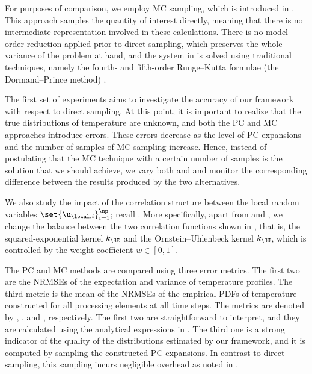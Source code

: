 For purposes of comparison, we employ \ac{MC} sampling, which is introduced in
. This approach samples the quantity of interest directly, meaning
that there is no intermediate representation involved in these calculations.
There is no model order reduction applied prior to direct sampling, which
preserves the whole variance of the problem at hand, and the system in
 is solved using traditional techniques, namely
the fourth- and fifth-order Runge--Kutta formulae (the Dormand--Prince method)
\cite{press2007}.


The first set of experiments aims to investigate the accuracy of our framework
with respect to direct sampling. At this point, it is important to realize that
the true distributions of temperature are unknown, and both the \ac{PC} and
\ac{MC} approaches introduce errors. These errors decrease as the level \lc of
\ac{PC} expansions and the number of samples \no of \ac{MC} sampling increase.
Hence, instead of postulating that the \ac{MC} technique with a certain number
of samples is the solution that we should achieve, we vary both \lc and \no and
monitor the corresponding difference between the results produced by the two
alternatives.

We also study the impact of the correlation structure between the local random
variables $\set{\u_{\local, i}}_{i = 1}^\np$; recall
. More specifically, apart from \lc and \no,
we change the balance between the two correlation functions shown in
, that is, the squared-exponential kernel $k_\SE$ and
the Ornstein--Uhlenbeck kernel $k_\OU$, which is controlled by the weight
coefficient $w \in [0, 1]$.

The \ac{PC} and \ac{MC} methods are compared using three error metrics. The
first two are the \acp{NRMSE} of the expectation and variance of temperature
profiles. The third metric is the mean of the \acp{NRMSE} of the empirical
\acp{PDF} of temperature constructed for all processing elements at all time
steps. The metrics are denoted by \error{\expectation}, \error{\variance}, and
, respectively. The first two are straightforward to interpret, and
they are calculated using the analytical expressions in .
The third one is a strong indicator of the quality of the distributions
estimated by our framework, and it is computed by sampling the constructed
\ac{PC} expansions. In contrast to direct sampling, this sampling incurs
negligible overhead as noted in .

